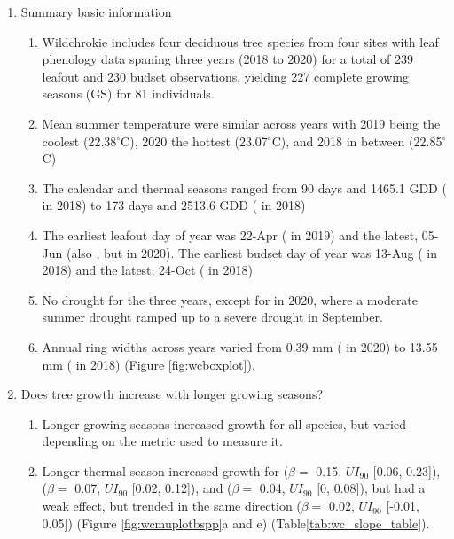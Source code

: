 \begin{enumerate}
\item Summary basic information
  \begin{enumerate}
  
  \item Wildchrokie includes four deciduous tree species from four sites with leaf phenology data spaning three years (2018 to 2020) for a total of 239 leafout and 
  230 budset observations, yielding 
  227 complete growing seasons (GS) for 
  81 individuals. 
    
  \item Mean summer temperature were similar across years with 2019 being the coolest (22.38$^\circ$C), 2020 the hottest (23.07$^\circ$C), and 2018 in between (22.85$^\circ$C)
    
  \item The calendar and thermal seasons ranged from 
  90 days and 
  1465.1 GDD ({\Ball} in 2018) to 
  173 days and 2513.6 GDD ({\Ainc} in 2018)

  \item The earliest leafout day of year was 
  22-Apr ({\Ainc} in
  2019) and the latest,
  05-Jun (also {\Ainc}, but in
  2020). 
  The earliest budset day of year was 
  13-Aug ({\Ball} in
  2018) and the latest, 
  24-Oct ({\Ainc} in
  2018) 
  
  \item No drought for the three years, except for in 2020, where a moderate summer drought ramped up to a severe drought in September.
  
  \item Annual ring widths across years varied from 
  0.39 mm ({\Ball} in 2020) to 
  13.55 mm ({\Bpop} in 2018) (Figure \ref{fig:wcboxplot}). 
 
\end{enumerate}

\item Does tree growth increase with longer growing seasons?
  \begin{enumerate}

  \item Longer growing seasons increased growth for all species, but varied depending on the metric used to measure it.

  \item Longer thermal season increased growth for {\Bpap} 
  ($\beta = $ 
  0.15, $UI_{90}$
  [0.06, 
  0.23]),
  {\Bpop} 
  ($\beta = $ 
  0.07, $UI_{90}$
  [0.02, 
  0.12]), and {\Ball} 
  ($\beta = $ 
  0.04, $UI_{90}$
  [0, 
  0.08]), but {\Ainc} had a weak effect, but trended in the same direction 
  ($\beta = $ 
  0.02, $UI_{90}$
  [-0.01, 
  0.05]) (Figure \ref{fig:wcmuplotbspp}a and e) (Table\ref{tab:wc_slope_table}).
 

\end{enumerate}
\end{enumerate}
